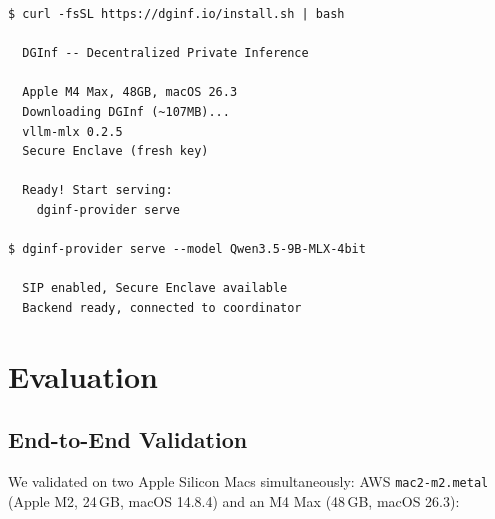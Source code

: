 \documentclass[10pt,twocolumn,letterpaper]{article}
\begin{document}
\begin{lstlisting}[caption={One-command provider setup.}]
$ curl -fsSL https://dginf.io/install.sh | bash

  DGInf -- Decentralized Private Inference

  Apple M4 Max, 48GB, macOS 26.3
  Downloading DGInf (~107MB)...
  vllm-mlx 0.2.5
  Secure Enclave (fresh key)

  Ready! Start serving:
    dginf-provider serve

$ dginf-provider serve --model Qwen3.5-9B-MLX-4bit

  SIP enabled, Secure Enclave available
  Backend ready, connected to coordinator
\end{lstlisting}

\section{Evaluation}

\subsection{End-to-End Validation}

We validated on two Apple Silicon Macs simultaneously: AWS \texttt{mac2-m2.metal} (Apple M2, 24\,GB, macOS 14.8.4) and an M4 Max (48\,GB, macOS 26.3):
\end{document}

